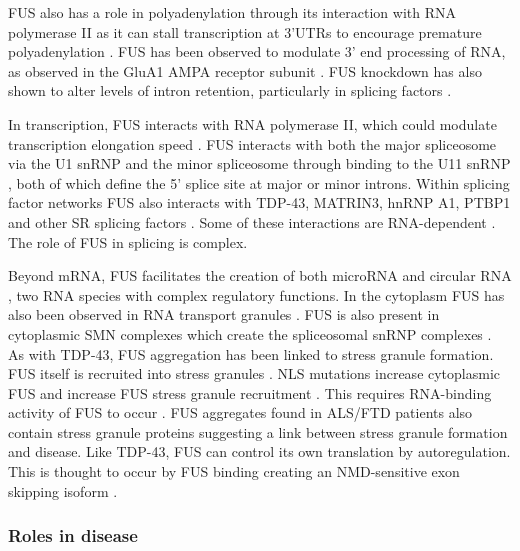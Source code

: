 FUS also has a role in polyadenylation through its interaction with RNA polymerase II \citep{Schwartz2012} as it can stall transcription at 3'UTRs to encourage premature polyadenylation \citep{Masuda2015}. 
FUS has been observed to modulate 3' end processing of RNA, as observed in the GluA1 AMPA receptor subunit \citep{Udagawa2015}. %
FUS knockdown has also shown to alter levels of intron retention, particularly in splicing factors \citep{VanBlitterswijk2013, Nakaya2013}.

In transcription, FUS interacts with RNA polymerase II, which could modulate transcription elongation speed \citep{Schwartz2012}.
FUS interacts with both the major spliceosome via the U1 snRNP \citep{Sun2015a, Yu2015a} and the minor spliceosome through binding to  the U11 snRNP \citep{Reber2016}, both of which define the 5' splice site at major or minor introns.
Within splicing factor networks FUS also interacts with TDP-43, MATRIN3, hnRNP A1, PTBP1 and other SR splicing factors \citep{Lagier-Tourenne2012,Yamaguchi2016,Yang1998,Meissner2003, Kamelgarn2016}. 
Some of these interactions are RNA-dependent \citep{Kamelgarn2016}.
The role of FUS in splicing is complex.

Beyond mRNA, FUS facilitates the creation of both microRNA \citep{Morlando2012} and circular RNA \citep{Errichelli2017}, two RNA species with complex regulatory functions.
In the cytoplasm FUS has also been observed in RNA transport granules \citep{Kanai2004, Fujii2005}.
FUS is also present in cytoplasmic SMN complexes which create the spliceosomal snRNP complexes  \citep{Yamazaki2012,Groen2013}.
As with TDP-43, FUS aggregation has been linked to stress granule formation.
FUS itself is recruited into stress granules \citep{Andersson2008,Yasuda2013}. 
NLS mutations increase cytoplasmic FUS and increase FUS stress granule recruitment \citep{Dormann2010, Bosco2010}.
This requires RNA-binding activity of FUS to occur \citep{Daigle2013} .
FUS aggregates found in ALS/FTD patients also contain stress granule proteins \citep{Dormann2010} suggesting a link between stress granule formation and disease.
Like TDP-43, FUS can control its own translation by autoregulation.
This is thought to occur by FUS binding creating an NMD-sensitive exon skipping isoform \citep{Zhou2013}.



\subsubsection{Roles in disease}

